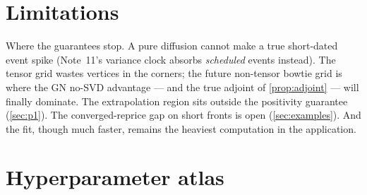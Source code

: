 \documentclass[11pt]{article}
\begin{document}
\section{Limitations}
\label{sec:limits}

Where the guarantees stop.  A pure diffusion cannot make a true short-dated
event spike (Note~11's variance clock absorbs \emph{scheduled} events
instead).  The tensor grid wastes vertices in the corners; the future
non-tensor bowtie grid is where the GN no-SVD advantage --- and the true
adjoint of \cref{prop:adjoint} --- will finally dominate.  The
extrapolation region sits outside the positivity guarantee
(\cref{sec:p1}).  The converged-reprice gap on short fronts is open
(\cref{sec:examples}).  And the fit, though much faster, remains the
heaviest computation in the application.

\appendix
\section{Hyperparameter atlas}
\label{app:atlas}
\end{document}
